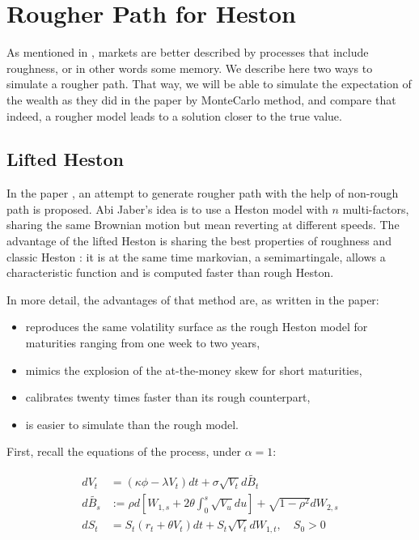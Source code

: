 \section{Rougher Path for Heston }
\label{rough_heston}
As mentioned in \cite{HanWong}, markets are better described by processes that include roughness, or in other words some memory. We describe here two ways to simulate a rougher path. That way, we will be able to simulate the expectation of the wealth as they did in the paper by MonteCarlo method, and compare that indeed, a rougher model leads to a solution closer to the true value.

\subsection{Lifted Heston}

In the paper \cite{lifted}, an attempt to generate rougher path with the help of non-rough path is proposed. Abi Jaber's idea is to use a Heston model with $n$ multi-factors, sharing the same Brownian motion but mean reverting at different speeds. The advantage of the lifted Heston is sharing the best properties of roughness and classic Heston : it is at the same time markovian, a semimartingale, allows a characteristic function and is computed faster than rough Heston.

In more detail, the advantages of that method are, as written in the paper:

\begin{itemize}
\item reproduces the same volatility surface as the rough Heston model for maturities ranging from one week to two years,
\item mimics the explosion of the at-the-money skew for short maturities,
\item calibrates twenty times faster than its rough counterpart,
\item is easier to simulate than the rough model.
\end{itemize}

First, recall the equations of the process, under $\alpha = 1$:

\begin{align*}
dV_t &= ( \kappa \phi - \lambda V_t ) dt + \sigma \sqrt{V_t} d \widetilde{B_t}   \\
d \widetilde{B_s } &:= \rho d [ W_{1,s} + 2 \theta \int_0^s \sqrt{ V_u } du ] + \sqrt{ 1 - \rho^2 } d W_{2,s}   \\
d S_t &= S_t ( r_t + \theta V_t ) dt + S_t \sqrt{V_t} d W_{1,t}, \quad S_0 > 0 
\end{align*}

